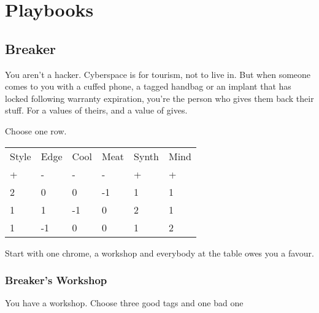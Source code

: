 \documentclass{tufte-book}
\begin{document}
\chapter{Playbooks} \label{ch:playbooks}

\section{Breaker} \label{sec: Breaker}

You aren't a hacker. Cyberspace is for tourism, not to live in. But when someone comes to you with a cuffed phone, a tagged handbag or an implant that has locked following warranty expiration, you're the person who gives them back their stuff. For a values of theirs, and a value of gives. 


Choose one row.
\begin{table}[ht]
\centering
{}\selectfont
\begin{tabular}{llllll}
\toprule
Style & Edge & Cool & Meat & Synth & Mind\\
+&-&-&-&+&+\\
\midrule
2&0&0&-1&1&1\\
1&1&-1&0&2&1\\
1&-1&0&0&1&2\\
\bottomrule
\end{tabular}
\end{table}

Start with one chrome, a workshop and everybody at the table owes you a favour.

\subsection{Breaker's Workshop}
You have a workshop. Choose three good tags and one bad one
\end{document}
